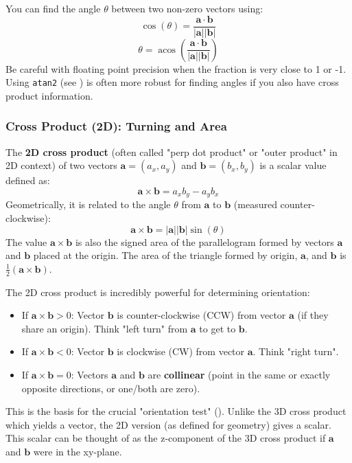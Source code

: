 \begin{mathinsight}
\label{mathinsight:A.1.1.angle_from_dot}
You can find the angle $\theta$ between two non-zero vectors using:
$$ \cos(\theta) = \frac{\mathbf{a} \cdot \mathbf{b}}{|\mathbf{a}| |\mathbf{b}|} $$
$$ \theta = \operatorname{acos}\left(\frac{\mathbf{a} \cdot \mathbf{b}}{|\mathbf{a}| |\mathbf{b}|}\right) $$
Be careful with floating point precision when the fraction is very close to 1 or -1. Using \texttt{atan2} (see ) is often more robust for finding angles if you also have cross product information.
\end{mathinsight}

\subsubsection{Cross Product (2D): Turning and Area}
\label{sssec:A.1.1.4}

\begin{definition}
\label{def:A.1.1.cross_product_2d}
The \textbf{2D cross product} (often called "perp dot product" or "outer product" in 2D context) of two vectors $\mathbf{a}=(a_x, a_y)$ and $\mathbf{b}=(b_x, b_y)$ is a scalar value defined as:
$$ \mathbf{a} \times \mathbf{b} = a_x b_y - a_y b_x $$
Geometrically, it is related to the angle $\theta$ from $\mathbf{a}$ to $\mathbf{b}$ (measured counter-clockwise):
$$ \mathbf{a} \times \mathbf{b} = |\mathbf{a}| |\mathbf{b}| \sin(\theta) $$
The value $\mathbf{a} \times \mathbf{b}$ is also the signed area of the parallelogram formed by vectors $\mathbf{a}$ and $\mathbf{b}$ placed at the origin. The area of the triangle formed by origin, $\mathbf{a}$, and $\mathbf{b}$ is $\frac{1}{2} (\mathbf{a} \times \mathbf{b})$.
\end{definition}

\begin{intuition}
\label{intuition:A.1.1.cross_product_2d}
The 2D cross product is incredibly powerful for determining orientation:
\begin{itemize}
    \item If $\mathbf{a} \times \mathbf{b} > 0$: Vector $\mathbf{b}$ is counter-clockwise (CCW) from vector $\mathbf{a}$ (if they share an origin). Think "left turn" from $\mathbf{a}$ to get to $\mathbf{b}$.
    \item If $\mathbf{a} \times \mathbf{b} < 0$: Vector $\mathbf{b}$ is clockwise (CW) from vector $\mathbf{a}$. Think "right turn".
    \item If $\mathbf{a} \times \mathbf{b} = 0$: Vectors $\mathbf{a}$ and $\mathbf{b}$ are \textbf{collinear} (point in the same or exactly opposite directions, or one/both are zero).
\end{itemize}
This is the basis for the crucial "orientation test" ().
Unlike the 3D cross product which yields a vector, the 2D version (as defined for geometry) gives a scalar. This scalar can be thought of as the z-component of the 3D cross product if $\mathbf{a}$ and $\mathbf{b}$ were in the xy-plane.
\end{intuition}

